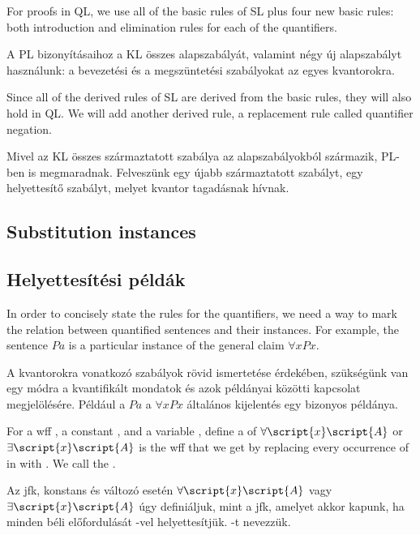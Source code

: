 For proofs in QL, we use all of the basic rules of SL plus four new basic rules: both introduction and elimination rules for each of the quantifiers.

A PL bizonyításaihoz a KL összes alapszabályát, valamint négy új alapszabályt használunk: a bevezetési és a megszüntetési szabályokat az egyes kvantorokra.

Since all of the derived rules of SL are derived from the basic rules, they will also hold in QL. We will add another derived rule, a replacement rule called quantifier negation.

Mivel az KL összes származtatott szabálya az alapszabályokból származik, PL-ben is megmaradnak. Felveszünk egy újabb származtatott szabályt, egy helyettesítő szabályt, melyet kvantor tagadásnak hívnak.

\subsection{Substitution instances}

\subsection{Helyettesítési példák}

In order to concisely state the rules for the quantifiers, we need a way to mark the relation between quantified sentences and their instances. For example, the sentence $Pa$ is a particular instance of the general claim $\forall x Px$.

A kvantorokra vonatkozó szabályok rövid ismertetése érdekében, szükségünk van egy módra a kvantifikált mondatok és azok példányai közötti kapcsolat megjelölésére. Például a $Pa$ a $\forall x Px$ általános kijelentés egy bizonyos példánya.



For a wff , a constant , and a variable , define a  of $\forall \script{x}\script{A}$ or $\exists \script{x}\script{A}$ is the wff that we get by replacing every occurrence of  in  with . We call  the .

Az  jfk,  konstans és  változó esetén $\forall \script{x}\script{A}$ vagy $\exists \script{x}\script{A}$   úgy definiáljuk, mint a jfk, amelyet akkor kapunk, ha  minden  béli előfordulását -vel helyettesítjük. -t  nevezzük.

